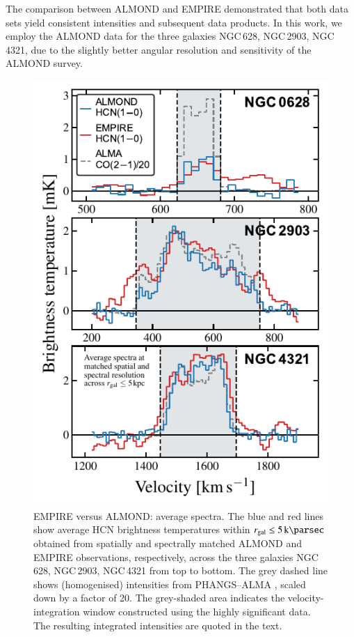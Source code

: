 \documentclass[letter, longauth]{aa} %
\begin{document}
\begin{appendix}
The comparison between ALMOND and EMPIRE demonstrated that both data sets yield consistent \hcnone intensities and subsequent data products.
In this work, we employ the ALMOND data for the three galaxies NGC\,628, NGC\,2903, NGC\,4321, due to the slightly better angular resolution and sensitivity of the ALMOND survey.

\begin{figure}
\centering
\includegraphics[width=\columnwidth]{Figures/ALMOND_vs_EMPIRE_spectra_compressed_v2.pdf}
\caption{EMPIRE versus ALMOND: \hcnone average spectra.
The blue and red lines show average HCN brightness temperatures within $\rgal\leq\SI{5}{\kilo\parsec}$ obtained from spatially and spectrally matched ALMOND and EMPIRE observations, respectively, across the three galaxies NGC\,628, NGC\,2903, NGC\,4321 from top to bottom.
The grey dashed line shows (homogenised) \cotwo intensities from PHANGS--ALMA \citep{Leroy2021b}, scaled down by a factor of 20.
The grey-shaded area indicates the velocity-integration window constructed using the highly significant \cotwo data.
The resulting integrated intensities are quoted in the text.
}
\label{fig:empire_vs_almond_spectra}
\end{figure}


\end{appendix}
\end{document}
